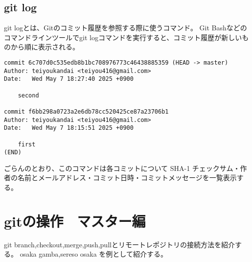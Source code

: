 \documentclass{article}
\begin{document}
\subsection{git log}
git logとは、Gitのコミット履歴を参照する際に使うコマンド。
\newline Git Bashなどのコマンドラインツールでgit logコマンドを実行すると、コミット履歴が新しいものから順に表示される。
\begin{lstlisting}
commit 6c707d0c535edb8b1bc708976773c46438885359 (HEAD -> master)
Author: teiyoukandai <teiyou416@gmail.com>
Date:   Wed May 7 18:27:40 2025 +0900

    second

commit f6bb298a0723a2e6db78cc520425ce87a23706b1
Author: teiyoukandai <teiyou416@gmail.com>
Date:   Wed May 7 18:15:51 2025 +0900

    first
(END)
\end{lstlisting}
 ごらんのとおり、このコマンドは各コミットについて SHA-1 チェックサム・作者の名前とメールアドレス・コミット日時・コミットメッセージを一覧表示する。
\section{gitの操作　マスター編}
git branch,checkout,merge,push,pullとリモートレポジトリの接続方法を紹介する。
osaka gamba,sereso osaka を例として紹介する。
\end{document}
